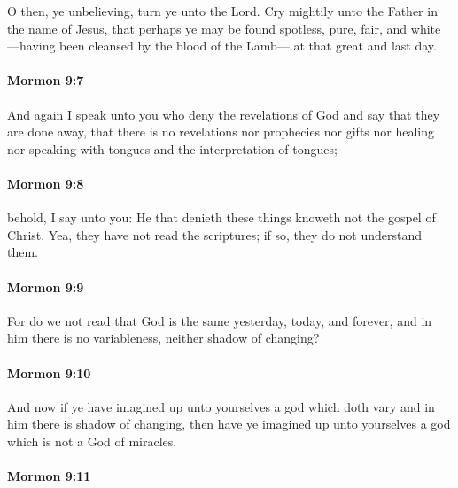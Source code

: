 			O then, ye unbelieving, turn ye unto the Lord.
			Cry mightily unto the Father in the name of Jesus,
			that perhaps ye may be found spotless, pure, fair, and white
			---having been cleansed by the blood of the Lamb---
			at that great and last day.

		\paragraph{Mormon 9:7} %
			\label{MORMON-9-7}

			And again I speak unto you who deny the revelations of God
			and say that they are done away,
			that there is no revelations nor prophecies nor gifts nor healing
			nor speaking with tongues and the interpretation of tongues;

		\paragraph{Mormon 9:8} %
			\label{MORMON-9-8}

			behold, I say unto you:
			He that denieth these things knoweth not the gospel of Christ.
			Yea, they have not read the scriptures;
			if so, they do not understand them.

		\paragraph{Mormon 9:9} %
			\label{MORMON-9-9}

			For do we not read that God is the same yesterday, today, and forever,
			and in him there is no variableness, neither shadow of changing?

		\paragraph{Mormon 9:10} %
			\label{MORMON-9-10}

			And now if ye have imagined up unto yourselves a god
			which doth vary and in him there is shadow of changing,
			then have ye imagined up unto yourselves a god
			which is not a God of miracles.

		\paragraph{Mormon 9:11} %
			\label{MORMON-9-11}

